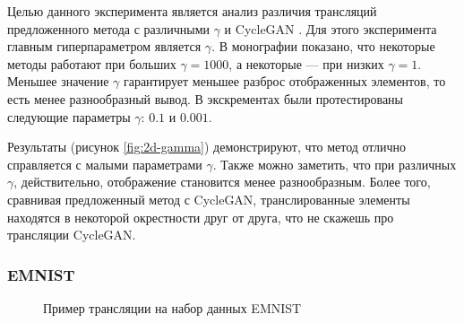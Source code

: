 Целью данного эксперимента является анализ различия трансляций предложенного метода с различными $\gamma$ и CycleGAN \cite{cycle-gan}. Для этого эксперимента главным гиперпараметром является $\gamma$. В монографии \cite{monography-sbp} показано, что некоторые методы работают при больших $\gamma = 1000$, а некоторые — при низких $\gamma = 1$. Меньшее значение $\gamma$ гарантирует меньшее разброс отображенных элементов, то есть менее разнообразный вывод. В экскрементах были протестированы следующие параметры $\gamma$: $0.1$ и $0.001$.

Результаты (рисунок \ref{fig:2d-gamma}) демонстрируют, что метод отлично справляется с малыми параметрами $\gamma$. Также можно заметить, что при различных $\gamma$, действительно, отображение становится менее разнообразным. Более того, сравнивая предложенный метод с CycleGAN, транслированные элементы находятся в некоторой окрестности друг от друга, что не скажешь про трансляции CycleGAN.

\subsubsection{EMNIST}

\begin{figure}
    \centering
    \hfill
    \caption{Пример трансляции на набор данных EMNIST}
    \label{fig:emnist-res}
\end{figure}

